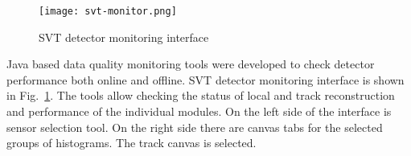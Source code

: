 \begin{figure}[hbt] 
\centering 
\texttt{[image: svt-monitor.png]}
\caption{SVT detector monitoring interface}
\label{fig:svt-monitor}
\end{figure}

Java based data quality monitoring tools were developed to check detector performance both online and offline. SVT detector monitoring interface is shown in Fig.~\ref{fig:svt-monitor}. The tools allow checking the status of local and track reconstruction and performance of the individual modules. On the left side of the interface is sensor selection tool. On the right side there are canvas tabs for the selected groups of histograms. The track canvas is selected.


